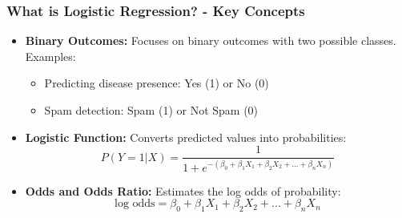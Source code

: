 \documentclass[aspectratio=169]{beamer}
\begin{document}
\begin{frame}[fragile]
    \frametitle{What is Logistic Regression? - Key Concepts}
    \begin{itemize}
        \item \textbf{Binary Outcomes:} Focuses on binary outcomes with two possible classes. Examples:
            \begin{itemize}
                \item Predicting disease presence: Yes (1) or No (0)
                \item Spam detection: Spam (1) or Not Spam (0)
            \end{itemize}
        
        \item \textbf{Logistic Function:} Converts predicted values into probabilities:
        \begin{equation}
            P(Y=1 | X) = \frac{1}{1 + e^{-(\beta_0 + \beta_1X_1 + \beta_2X_2 + ... + \beta_nX_n)}}
        \end{equation}
        
        \item \textbf{Odds and Odds Ratio:} Estimates the log odds of probability:
        \begin{equation}
            \text{log odds} = \beta_0 + \beta_1X_1 + \beta_2X_2 + ... + \beta_nX_n
        \end{equation}
    \end{itemize}
\end{frame}
\end{document}
